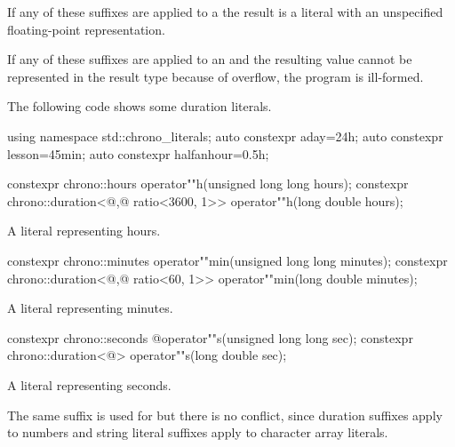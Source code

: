 \pnum
If any of these suffixes are applied to a 
the result is a
 literal with an unspecified floating-point representation.

\pnum
If any of these suffixes are applied to an 
and the resulting
 value cannot be represented in the result type because
of overflow, the program is ill-formed.

\pnum
\begin{example}
The following code shows some duration literals.
\begin{codeblock}
using namespace std::chrono_literals;
auto constexpr aday=24h;
auto constexpr lesson=45min;
auto constexpr halfanhour=0.5h;
\end{codeblock}
\end{example}

%
\begin{itemdecl}
constexpr chrono::hours                                 operator""h(unsigned long long hours);
constexpr chrono::duration<@\unspec,@ ratio<3600, 1>> operator""h(long double hours);
\end{itemdecl}

\begin{itemdescr}
\pnum
\returns
A  literal representing  hours.
\end{itemdescr}

%
\begin{itemdecl}
constexpr chrono::minutes                             operator""min(unsigned long long minutes);
constexpr chrono::duration<@\unspec,@ ratio<60, 1>> operator""min(long double minutes);
\end{itemdecl}

\begin{itemdescr}
\pnum
\returns
A  literal representing  minutes.
\end{itemdescr}

%
\begin{itemdecl}
constexpr chrono::seconds  @\itcorr@             operator""s(unsigned long long sec);
constexpr chrono::duration<@\unspec@> operator""s(long double sec);
\end{itemdecl}

\begin{itemdescr}
\pnum
\returns
A  literal representing  seconds.

\pnum
\begin{note}
The same suffix  is used for  but there is no
conflict, since duration suffixes apply to numbers and string literal suffixes
apply to character array literals.
\end{note}
\end{itemdescr}

